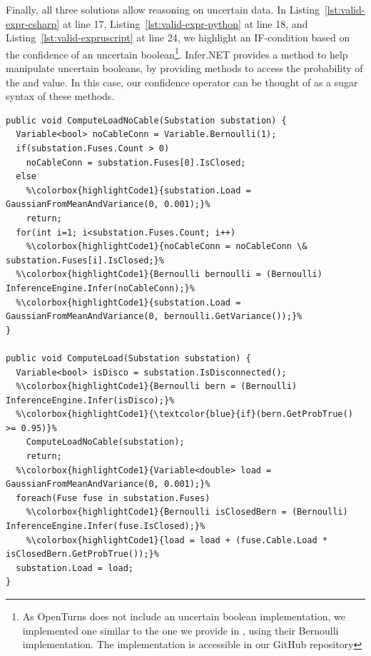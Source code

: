 Finally, all three solutions allow reasoning on uncertain data.
In Listing~\ref{lst:valid-expr-csharp} at line 17, Listing~\ref{lst:valid-expr-python} at line 18, and Listing~\ref{lst:valid-expruscript} at line 24, we highlight an IF-condition based on the confidence of an uncertain boolean\footnote{As OpenTurns does not include an uncertain boolean implementation, we implemented one similar to the one we provide in \langName{}, using their Bernoulli implementation. The implementation is  accessible in our GitHub repository}.
Infer.NET provides a method to help manipulate uncertain booleans, by providing methods to access the probability of the \true{} and \false{} value.
In this case, our confidence operator can be thought of as a sugar syntax of these methods.

\begin{lstlisting}[style=cSharpStyle, caption={Excerpt of the Infer.NET implementation (C\#)}, label=lst:valid-expr-csharp, linewidth=0.97\textwidth, escapechar=\%]
public void ComputeLoadNoCable(Substation substation) {
  Variable<bool> noCableConn = Variable.Bernoulli(1);
  if(substation.Fuses.Count > 0)
    noCableConn = substation.Fuses[0].IsClosed;
  else
    %\colorbox{highlightCode1}{substation.Load = GaussianFromMeanAndVariance(0, 0.001);}%
    return;
  for(int i=1; i<substation.Fuses.Count; i++)
    %\colorbox{highlightCode1}{noCableConn = noCableConn \& substation.Fuses[i].IsClosed;}%
  %\colorbox{highlightCode1}{Bernoulli bernoulli = (Bernoulli) InferenceEngine.Infer(noCableConn);}%
  %\colorbox{highlightCode1}{substation.Load = GaussianFromMeanAndVariance(0, bernoulli.GetVariance());}%
}

public void ComputeLoad(Substation substation) {
  Variable<bool> isDisco = substation.IsDisconnected();
  %\colorbox{highlightCode1}{Bernoulli bern = (Bernoulli) InferenceEngine.Infer(isDisco);}%
  %\colorbox{highlightCode1}{\textcolor{blue}{if}(bern.GetProbTrue() >= 0.95)}%
    ComputeLoadNoCable(substation);
    return;
  %\colorbox{highlightCode1}{Variable<double> load = GaussianFromMeanAndVariance(0, 0.001);}%
  foreach(Fuse fuse in substation.Fuses)
    %\colorbox{highlightCode1}{Bernoulli isClosedBern = (Bernoulli) InferenceEngine.Infer(fuse.IsClosed);}%                         
    %\colorbox{highlightCode1}{load = load + (fuse.Cable.Load * isClosedBern.GetProbTrue());}%
  substation.Load = load;
}
\end{lstlisting}


